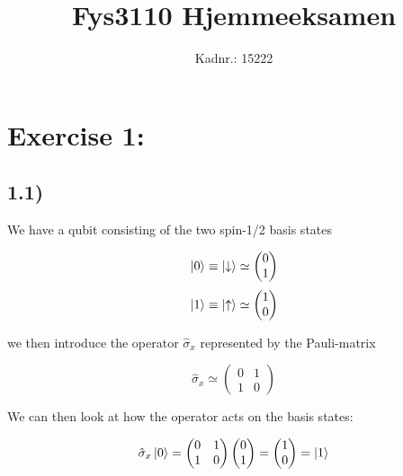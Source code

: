 \documentclass[a4paper,norsk, 10pt]{article}
\title{Fys3110 Hjemmeeksamen}
\author{Kadnr.: 15222 }
\begin{document}
\maketitle

\section{Exercise 1:}

\subsection{1.1)}\label{sec:11}
We have a qubit consisting of the two spin-1/2 basis states

\begin{equation}
\ket{0} \equiv \ket{\downarrow} \simeq 
\begin{pmatrix}
0 \\ 1
\end{pmatrix}
\end{equation}
\begin{equation}
\ket{1} \equiv \ket{\uparrow} \simeq 
\begin{pmatrix}
1 \\ 0
\end{pmatrix}
\end{equation}

we then introduce the operator $\hat{\sigma}_x$ represented by the Pauli-matrix

\begin{equation}
\hat{\sigma}_x \simeq
\begin{pmatrix}
0 & 1\\
1 & 0
\end{pmatrix}
\end{equation}

We can then look at how the operator acts on the basis states:

\begin{equation}
\hat{\sigma}_x\ket{0} = 
\begin{pmatrix}
0 & 1\\
1 & 0
\end{pmatrix}
\begin{pmatrix}
0 \\ 1
\end{pmatrix} = 
\begin{pmatrix}
1 \\ 0
\end{pmatrix} = \ket{1}
\end{equation}
\end{document}
